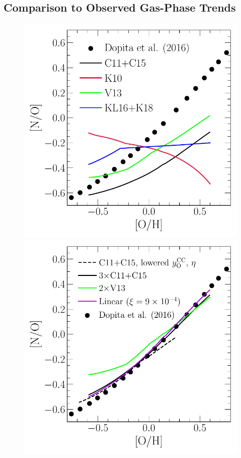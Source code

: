 \documentclass[ms.tex]{subfiles}
\begin{document}
\subsection{Comparison to Observed Gas-Phase Trends}
\label{sec:results:yields}

\begin{figure}
\centering
\includegraphics[scale = 0.45]{no_oh_predictions_unmodified.pdf}
\includegraphics[scale = 0.45]{no_oh_predictions.pdf}

\end{figure}
\end{document}
